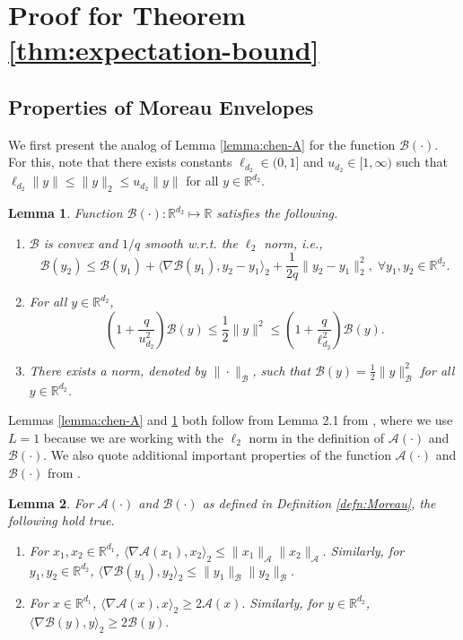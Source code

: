 \documentclass[letterpaper, 10 pt, conference]{ieeeconf}  %
\theoremstyle{definition}
\theoremstyle{plain}
\newtheorem{lemma}{Lemma}
\newcommand{\RR}{\mathbb{R}}
\newcommand{\Acal}{\mathcal{A}}
\newcommand{\Bcal}{\mathcal{B}}
\begin{document}
\newpage
\onecolumn
\appendices

\section{Proof for Theorem \ref{thm:expectation-bound}}\label{app:proof}
\subsection{\textbf{Properties of Moreau Envelopes}}\label{app:proof-Moreau}
We first present the analog of Lemma \ref{lemma:chen-A} for the function $\Bcal(\cdot)$. For this, note that there exists constants $\ell_{d_2}\in(0,1]$ and $u_{d_2}\in[1,\infty)$ such that $\ell_{d_2}\|y\|\leq \|y\|_2\leq u_{d_2}\|y\|$ for all $y\in\RR^{d_2}$.
\begin{lemma}\label{lemma:chen-B}
    Function $\Bcal(\cdot):\RR^{d_2}\mapsto\RR$ satisfies the following.
    \begin{enumerate}[label=(\alph*)]
        \item $\Bcal$ is convex and $1/q$ smooth w.r.t. the $\ell_2$ norm, i.e.,
        $$\Bcal(y_2)\leq \Bcal(y_1)+\langle\nabla \Bcal(y_1), y_2-y_1\rangle_2 + \frac{1}{2q}\|y_2-y_1\|^2_2, \;\forall y_1,y_2\in\RR^{d_2}.$$
        \item For all $y\in\RR^{d_2}$, $$\left(1+\frac{q}{u_{d_2}^2}\right)\Bcal(y)\leq \frac{1}{2}\|y\|^2\leq \left(1+\frac{q}{\ell_{d_2}^2}\right)\Bcal(y).$$
        \item There exists a norm, denoted by $\|\cdot\|_\Bcal$, such that $\Bcal(y)=\frac{1}{2}\|y\|_\Bcal^2$ for all $y\in\RR^{d_2}$. 
    \end{enumerate}
\end{lemma}
Lemmas \ref{lemma:chen-A} and \ref{lemma:chen-B} both follow from Lemma 2.1 from \cite{chenfinite}, where we use $L=1$ because we are working with the $\ell_2$ norm in the definition of $\Acal(\cdot)$ and $\Bcal(\cdot)$. We also quote additional important properties of the function $\Acal(\cdot)$ and $\Bcal(\cdot)$ from \cite{chenfinite}. 
\begin{lemma}\label{lemma:subg}
    For $\Acal(\cdot)$ and $\Bcal(\cdot)$ as defined in Definition \ref{defn:Moreau}, the following hold true.
    \begin{enumerate}[label=(\alph*)]
        \item  For $x_1,x_2\in\RR^{d_1}$,  $\langle \nabla \Acal(x_1),x_2\rangle_2 \leq \|x_1\|_\Acal\|x_2\|_\Acal.$ Similarly, for $y_1,y_2\in\RR^{d_2}$,  $\langle \nabla \Bcal(y_1),y_2\rangle_2 \leq \|y_1\|_\Bcal\|y_2\|_\Bcal.$
        \item For $x\in\RR^{d_1}$, 
        $\langle \nabla \Acal(x), x\rangle_2\geq 2\Acal(x).$ Similarly, for $y\in\RR^{d_2}$, 
        $\langle \nabla \Bcal(y), y\rangle_2\geq 2\Bcal(y).$
    \end{enumerate}
\end{lemma}
\end{document}
